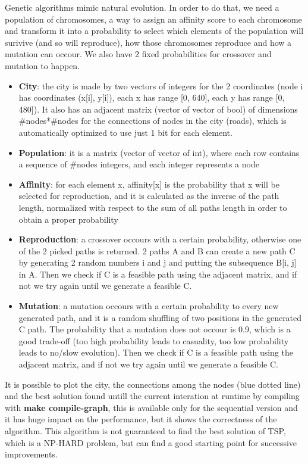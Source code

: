 \documentclass{article}
\begin{document}
        Genetic algorithms mimic natural evolution. In order to do that, we need a population of chromosomes, a way to assign an affinity score to each chromosome and transform it into a probability to select which elements of the population will surivive (and so will reproduce), how those chromosomes reproduce and how a mutation can occour. We also have 2 fixed probabilities for crossover and mutation to happen.
	\begin{itemize}
	    \item \textbf{City}: the city is made by two vectors of integers for the 2 coordinates (node i has coordinates (x[i], y[i]), each x has range [0, 640], each y has range [0, 480]). It also has an adjacent matrix (vector of vector of bool) of dimensions \#nodes*\#nodes for the connections of nodes in the city (roads), which is automatically optimized to use just 1 bit for each element.
	    \item \textbf{Population}: it is a matrix (vector of vector of int), where each row contains a sequence of \#nodes integers, and each integer represents a node
	    \item \textbf{Affinity}: for each element x, affinity[x] is the probability that x will be selected for reproduction, and it is calculated as the inverse of the path length, normalized with respect to the sum of all paths length in order to obtain a proper probability
	    \item \textbf{Reproduction}: a crossover occours with a certain probability, otherwise one of the 2 picked paths is returned. 2 paths A and B can create a new path C by generating 2 random numbers i and j and putting the subsequence B[i, j] in A. Then we check if C is a feasible path using the adjacent matrix, and if not we try again until we generate a feasible C.
	    \item \textbf{Mutation}: a mutation occours with a certain probability to every new generated path, and it is a random shuffling of two positions in the generated C path. The probability that a mutation does not occour is 0.9, which is a good trade-off (too high probability leads to casuality, too low probability leads to no/slow evolution). Then we check if C is a feasible path using the adjacent matrix, and if not we try again until we generate a feasible C.
	\end{itemize}
	It is possible to plot the city, the connections among the nodes (blue dotted line) and the best solution found untill the current interation at runtime by compiling with \textbf{make compile-graph}, this is available only for the sequential version and it has huge impact on the performance, but it shows the correctness of the algorithm. This algorithm is not guaranteed to find the best solution of TSP, which is a NP-HARD problem, but can find a good starting point for successive improvements.
\end{document}
